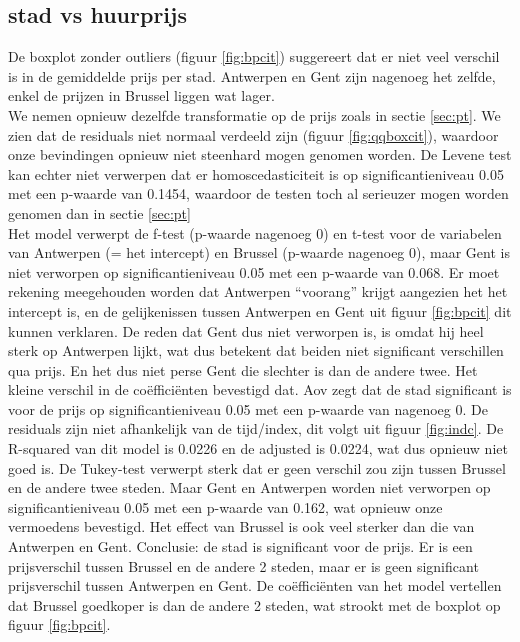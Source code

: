 \documentclass[a4paper,kulak]{kulakarticle} %
\begin{document}
\subsection{stad vs huurprijs}
De boxplot zonder outliers (figuur \ref{fig:bpcit}) suggereert  dat er niet veel verschil is in de gemiddelde prijs per stad. Antwerpen en Gent zijn nagenoeg het zelfde, enkel de prijzen in Brussel liggen wat lager. \\
We nemen opnieuw dezelfde transformatie op de prijs zoals in sectie \ref{sec:pt}.
We zien dat de residuals niet normaal verdeeld zijn (figuur \ref{fig:qqboxcit}), waardoor onze bevindingen opnieuw niet steenhard mogen genomen worden. De Levene test kan echter niet verwerpen dat er homoscedasticiteit is op significantieniveau 0.05 met een p-waarde van 0.1454, waardoor de testen toch al serieuzer mogen worden genomen dan in sectie \ref{sec:pt}\\
Het model verwerpt de f-test (p-waarde nagenoeg 0) en t-test voor de variabelen van Antwerpen (= het intercept) en Brussel (p-waarde nagenoeg 0), maar Gent is niet verworpen op significantieniveau 0.05 met een p-waarde van 0.068. 
Er moet rekening meegehouden worden dat Antwerpen ``voorang'' krijgt aangezien het het intercept is, en de gelijkenissen tussen Antwerpen en Gent uit figuur \ref*{fig:bpcit} dit kunnen verklaren. 
De reden dat Gent dus niet verworpen is, is omdat hij heel sterk op Antwerpen lijkt, wat dus betekent dat beiden niet significant verschillen qua prijs.
En het dus niet perse Gent die slechter is dan de andere twee. Het kleine verschil in de coëfficiënten bevestigd dat.
Aov zegt dat de stad significant is voor de prijs op significantieniveau 0.05 met een p-waarde van nagenoeg 0. 
De residuals zijn niet afhankelijk van de tijd/index, dit volgt uit figuur \ref{fig:indc}.
De R-squared van dit model is 0.0226 en de adjusted is 0.0224, wat dus opnieuw niet goed is.
De Tukey-test verwerpt sterk dat er geen verschil zou zijn tussen Brussel en de andere twee steden. Maar Gent en Antwerpen worden niet verworpen op significantieniveau 0.05 met een p-waarde van 0.162, wat opnieuw onze vermoedens bevestigd. 
Het effect van Brussel is ook veel sterker dan die van Antwerpen en Gent. 
Conclusie: de stad is significant voor de prijs. Er is een prijsverschil tussen Brussel en de andere 2 steden, maar er is geen significant prijsverschil tussen Antwerpen en Gent.
De coëfficiënten van het model vertellen dat Brussel goedkoper is dan de andere 2 steden, wat strookt met de boxplot op figuur \ref{fig:bpcit}.
\end{document}
